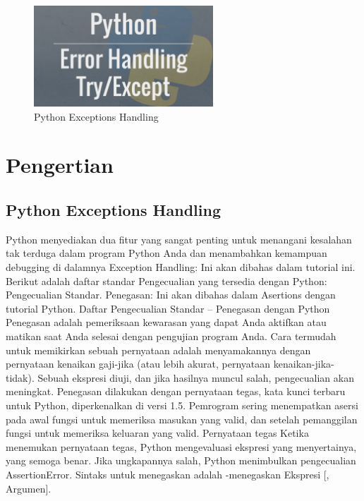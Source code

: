 
 \begin{figure}[ht]
 	\centerline{\includegraphics[width=0.60\textwidth]{Gambar/dapi6.jpg}}
 	\caption{Python Exceptions Handling}
 	\label{Python Exceptions Handling}
 \end{figure}
 
 
 
 \section {Pengertian }
 \subsection {Python Exceptions Handling}
 
 
 \hspace*{0.64in} Python menyediakan dua fitur yang sangat penting untuk menangani kesalahan tak terduga dalam program Python Anda dan menambahkan kemampuan debugging di dalamnya Exception Handling: Ini akan dibahas dalam tutorial ini. Berikut adalah daftar standar Pengecualian yang tersedia dengan Python: Pengecualian Standar. Penegasan: Ini akan dibahas dalam Asertions dengan tutorial Python. Daftar Pengecualian Standar – Penegasan dengan Python Penegasan adalah pemeriksaan kewarasan yang dapat Anda aktifkan atau matikan saat Anda selesai dengan pengujian program Anda. Cara termudah untuk memikirkan sebuah pernyataan adalah menyamakannya dengan pernyataan kenaikan gaji-jika (atau lebih akurat, pernyataan kenaikan-jika-tidak). Sebuah ekspresi diuji, dan jika hasilnya muncul salah, pengecualian akan meningkat. Penegasan dilakukan dengan pernyataan tegas, kata kunci terbaru untuk Python, diperkenalkan di versi 1.5. Pemrogram sering menempatkan asersi pada awal fungsi untuk memeriksa masukan yang valid, dan setelah pemanggilan fungsi untuk memeriksa keluaran yang valid. Pernyataan tegas Ketika menemukan pernyataan tegas, Python mengevaluasi ekspresi yang menyertainya, yang semoga benar. Jika ungkapannya salah, Python menimbulkan pengecualian AssertionError. Sintaks untuk menegaskan adalah -menegaskan Ekspresi [, Argumen]. 
 
